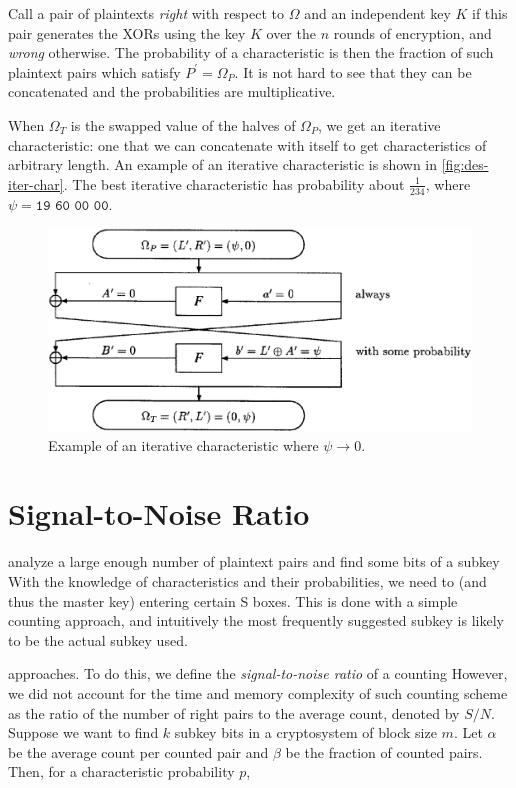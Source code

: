 \documentclass[twoside]{article}
\begin{document}
Call a pair of plaintexts \emph{right} with respect to \(\Omega\) and an
independent key \(K\) if this pair generates the XORs using the key \(K\) over
the \(n\) rounds of encryption, and \emph{wrong} otherwise. The probability of a
characteristic is then the fraction of such plaintext pairs which satisfy
\(P^\prime = \Omega_P\). It is not hard to see that they can be concatenated and
the probabilities are multiplicative.

When \(\Omega_T\) is the swapped value of the halves of \(\Omega_P\), we get an
iterative characteristic: one that we can concatenate with itself to get
characteristics of arbitrary length. An example of an iterative characteristic
is shown in \autoref{fig:des-iter-char}. The best iterative characteristic has
probability about \(\frac{1}{234}\), where \(\psi = \texttt{19 60 00 00}\).

\begin{figure}[!ht]
    \centering
    \includegraphics[width=0.5\linewidth]{images/des_iter_char.png}
    \caption{Example of an iterative characteristic where \(\psi \rightarrow 0\).}
    \label{fig:des-iter-char}
\end{figure}

\section{Signal-to-Noise Ratio}
analyze a large enough number of plaintext pairs and find some bits of a subkey
With the knowledge of characteristics and their probabilities, we need to
(and thus the master key) entering certain S boxes. This is done with a simple
counting approach, and intuitively the most frequently suggested subkey is
likely to be the actual subkey used.

approaches. To do this, we define the \emph{signal-to-noise ratio} of a counting
However, we did not account for the time and memory complexity of such counting
scheme as the ratio of the number of right pairs to the average count, denoted
by \(S/N\). Suppose we want to find \(k\) subkey bits in a cryptosystem of block
size \(m\). Let \(\alpha\) be the average count per counted pair and \(\beta\)
be the fraction of counted pairs. Then, for a characteristic probability \(p\),
\end{document}
